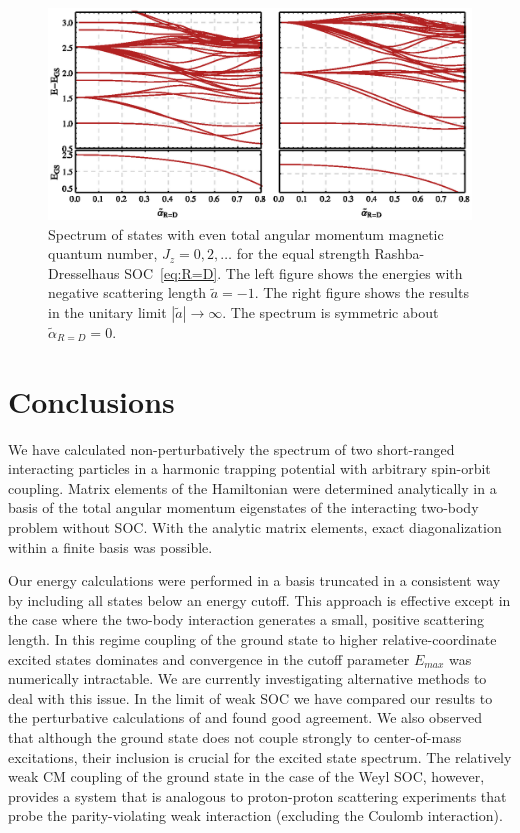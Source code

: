 \documentclass[%
 onecolumn,
 notitlepage,
 amsmath,amssymb,
 aps,
]{revtex4-1}
\begin{document}
\begin{figure}
\includegraphics{Figures/RashbaDresselhausSpectrum}
\caption{\label{fig:R=DExcitationSpectrum} 
Spectrum of states with even total angular momentum magnetic quantum number, $J_z=0,2,\dots$ for the equal strength Rashba-Dresselhaus SOC~\eqref{eq:R=D}. The left figure shows the energies with negative scattering length $\tilde{a}=-1$. The right figure shows the results in the unitary limit $|\tilde{a}|\rightarrow\infty$. The spectrum is symmetric about $\tilde{\alpha}_{R=D}=0$.} 
\end{figure}


\section{Conclusions}

We have calculated non-perturbatively the spectrum of two short-ranged interacting particles in a harmonic trapping potential with arbitrary spin-orbit coupling. Matrix elements of the Hamiltonian were determined analytically in a basis of the total angular momentum eigenstates of the interacting two-body problem without SOC. With the analytic matrix elements, exact diagonalization within a finite basis was possible.

Our energy calculations were performed in a basis truncated in a consistent way by including all states below an energy cutoff. This approach is effective except in the case where the two-body interaction generates a small, positive scattering length. In this regime coupling of the ground state to higher relative-coordinate excited states dominates and convergence in the cutoff parameter $E_{max}$ was numerically intractable. We are currently investigating alternative methods to deal with this issue. In the limit of weak SOC we have compared our results to the perturbative calculations of \cite{PhysRevA.89.033606} and found good agreement. We also observed that although the ground state does not couple strongly to center-of-mass excitations, their inclusion is crucial for the excited state spectrum.  The relatively weak CM coupling of the ground state in the case of the Weyl SOC, however, provides a system that is analogous to proton-proton scattering experiments that probe the parity-violating weak interaction (excluding the Coulomb interaction). 
\end{document}
